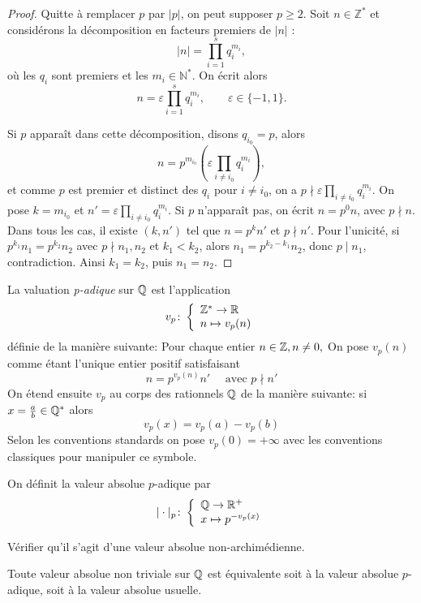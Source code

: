 \begin{proof}
Quitte à remplacer $p$ par $|p|$, on peut supposer $p \ge 2$.
Soit $n \in \mathbb Z^*$ et considérons la décomposition en facteurs premiers de $|n|$ :
\[
|n| = \prod_{i=1}^s q_i^{m_i},
\]
où les $q_i$ sont premiers et les $m_i \in \mathbb N^*$.
On écrit alors
\[
n = \varepsilon \prod_{i=1}^s q_i^{m_i},
\qquad \varepsilon \in \{-1,1\}.
\]

Si $p$ apparaît dans cette décomposition, disons $q_{i_0}=p$, alors
\[
n = p^{m_{i_0}} \left( \varepsilon \prod_{i \neq i_0} q_i^{m_i} \right),
\]
et comme $p$ est premier et distinct des $q_i$ pour $i \neq i_0$, on a
$p \nmid \varepsilon \prod_{i \neq i_0} q_i^{m_i}$.
On pose $k=m_{i_0}$ et $n'=\varepsilon \prod_{i \neq i_0} q_i^{m_i}$.
Si $p$ n'apparaît pas, on écrit $n=p^0 n$, avec $p \nmid n$.
Dans tous les cas, il existe $(k,n')$ tel que $n=p^k n'$ et $p \nmid n'$.
Pour l'unicité, si $p^{k_1}n_1=p^{k_2}n_2$ avec $p \nmid n_1,n_2$ et $k_1<k_2$,
alors $n_1=p^{k_2-k_1}n_2$, donc $p \mid n_1$, contradiction.
Ainsi $k_1=k_2$, puis $n_1=n_2$.
\end{proof}
\begin{definition}
    La valuation \emph{p-adique} sur $\mathbb{Q}$ est l'application 
    \[
    v_p\colon \left\{\begin{array}{l}\mathbb{Z}^* \to \mathbb{R} \\n\mapsto v_p(n)\end{array}\right.
    \]
    définie de la manière suivante: Pour chaque entier $n\in \mathbb{Z}, n\neq 0,$ On pose $v_p(n)$ comme étant l'unique entier positif satisfaisant
    \[
    n= p^{v_p(n)}n' \quad \text{ avec } p\nmid n'
    \]
    On étend ensuite $v_p$ au corps des rationnels $\mathbb{Q}$ de la manière suivante: si $x = \frac{a}{b}\in \mathbb{Q}^*$ alors 
    \[
    v_p(x)= v_p(a)-v_p(b)
    \]
    Selon les conventions standards on pose $v_p(0)= +\infty$ avec les conventions classiques pour manipuler ce symbole.
\end{definition}

\begin{definition}
 On définit la valeur absolue $p$-adique par
 \[
 |\cdot|_p\colon \left\{\begin{array}{l}\mathbb{Q}\to \mathbb{R}^+ \\x\mapsto p^{-v_p(x)} \end{array}\right.
 \]
\end{definition}

\begin{exercice}
    Vérifier qu'il s'agit d'une valeur absolue non-archimédienne.
\end{exercice}

\begin{theoreme}
Toute valeur absolue non triviale sur $\mathbb{Q}$ est équivalente soit à la valeur absolue $p$-adique, soit à la valeur absolue usuelle.
\end{theoreme}

